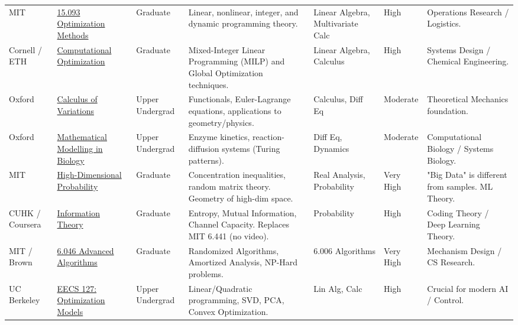 \documentclass[10pt, a4paper, landscape]{article}
\begin{document}
\begin{longtable}{L{2cm} L{3.5cm} L{1.8cm} L{6cm} L{3.5cm} L{2cm} L{5cm}}
    \addlinespace
    \addlinespace
    MIT & \href{https://ocw.mit.edu/courses/15-093-optimization-methods-fall-2009/}{15.093 Optimization Methods} & Graduate & Linear, nonlinear, integer, and dynamic programming theory. & Linear Algebra, Multivariate Calc & High & Operations Research / Logistics. \\
    \addlinespace
    \addlinespace
    Cornell / ETH & \href{https://www.coursera.org/learn/discrete-optimization}{Computational Optimization} & Graduate & Mixed-Integer Linear Programming (MILP) and Global Optimization techniques. & Linear Algebra, Calculus & High & Systems Design / Chemical Engineering. \\
    \addlinespace
    Oxford & \href{https://courses.maths.ox.ac.uk/}{Calculus of Variations} & Upper Undergrad & Functionals, Euler-Lagrange equations, applications to geometry/physics. & Calculus, Diff Eq & Moderate & Theoretical Mechanics foundation. \\
    \addlinespace
    Oxford & \href{https://www.maths.ox.ac.uk/groups/mathematical-biology}{Mathematical Modelling in Biology} & Upper Undergrad & Enzyme kinetics, reaction-diffusion systems (Turing patterns). & Diff Eq, Dynamics & Moderate & Computational Biology / Systems Biology. \\
    \addlinespace
    MIT & \href{https://ocw.mit.edu/courses/18-s997-high-dimensional-probability-and-statistics-non-asymptotic-viewpoint-fall-2015/}{High-Dimensional Probability} & Graduate & Concentration inequalities, random matrix theory. Geometry of high-dim space. & Real Analysis, Probability & Very High & "Big Data" is different from samples. ML Theory. \\
    \addlinespace
    CUHK / Coursera & \href{https://www.coursera.org/learn/information-theory}{Information Theory} & Graduate & Entropy, Mutual Information, Channel Capacity. Replaces MIT 6.441 (no video). & Probability & High & Coding Theory / Deep Learning Theory. \\
    \addlinespace
    MIT / Brown & \href{https://ocw.mit.edu/courses/6-046j-design-and-analysis-of-algorithms-spring-2015/}{6.046 Advanced Algorithms} & Graduate & Randomized Algorithms, Amortized Analysis, NP-Hard problems. & 6.006 Algorithms & Very High & Mechanism Design / CS Research. \\
    \addlinespace
    UC Berkeley & \href{https://inst.eecs.berkeley.edu/~ee127/}{EECS 127: Optimization Models} & Upper Undergrad & Linear/Quadratic programming, SVD, PCA, Convex Optimization. & Lin Alg, Calc & High & Crucial for modern AI / Control. \\


\end{longtable}
\end{document}
